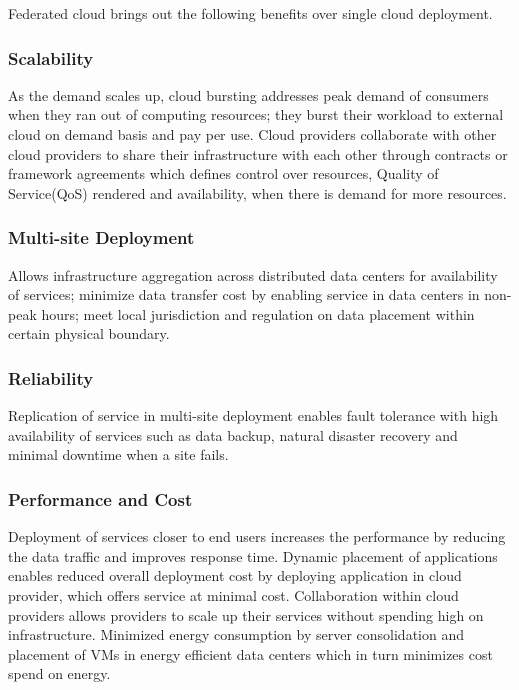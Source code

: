 \documentclass[conference]{IEEEtran}
\begin{document}
Federated cloud brings out the following benefits over single cloud deployment.

\subsubsection{Scalability}

As the demand scales up, cloud bursting addresses peak demand of consumers when they ran out of computing resources; they burst their workload to external cloud on demand basis and pay per use. Cloud providers collaborate with other cloud providers to share their infrastructure with each other through contracts or framework agreements which defines control over resources, Quality of Service(QoS) rendered and availability, when there is demand for more resources.

\subsubsection{Multi-site Deployment}

Allows infrastructure aggregation across distributed data centers for availability of services; minimize data transfer cost by enabling service in data centers in non-peak hours; meet local jurisdiction and regulation on data placement within certain physical boundary.

\subsubsection{Reliability} 

Replication of service in multi-site deployment enables fault tolerance with high availability of services such as data backup, natural disaster recovery and minimal downtime when a site fails.

\subsubsection{Performance and Cost} 
Deployment of services closer to end users increases the performance by reducing the data traffic and improves response time. Dynamic placement of applications enables reduced overall deployment cost by deploying application in cloud provider, which offers service at minimal cost. Collaboration within cloud providers allows providers to scale up their services without spending high on infrastructure. Minimized energy consumption by server consolidation and placement of VMs in energy efficient data centers which in turn minimizes cost spend on energy.
\end{document}
